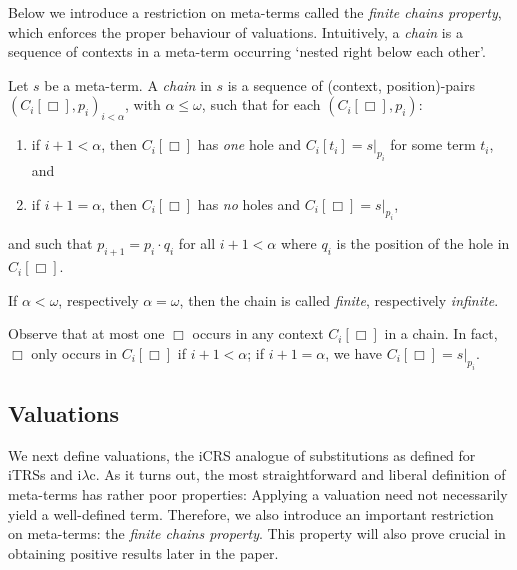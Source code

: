 \documentclass{LMCS}
\theoremstyle{plain}
\theoremstyle{definition}
\newcommand{\iLC}{i$\lambda$c\xspace}
\begin{document}
Below we introduce a restriction on meta-terms called the \emph{finite chains property}, which enforces the proper behaviour of valuations. Intuitively, a \emph{chain} is a sequence of contexts in a meta-term occurring `nested right below each other'.
\begin{defi}
Let $s$ be a meta-term.  A \emph{chain} in $s$ is a sequence
of (context, position)-pairs $(C_i[\Box],p_i)_{i < \alpha}$, with
$\alpha \leq \omega$, such that for each $(C_i[\Box], p_i)$:
\begin{enumerate}[(1)]
\item
if $i + 1 < \alpha$, then $C_i[\Box]$ has \emph{one} hole and $C_i[t_i] = s|_{p_i}$ for some term $t_i$, and
\item
if $i + 1 = \alpha$, then $C_i[\Box]$ has \emph{no} holes and $C_i[\Box] = s|_{p_i}$,
\end{enumerate}
and such that $p_{i+1} = p_i \cdot q_i$ for all $i + 1 < \alpha$ where $q_i$ is the position of the hole in $C_i[\Box]$.

If $\alpha < \omega$, respectively
$\alpha = \omega$, then the chain is called \emph{finite},
respectively \emph{infinite}.
\end{defi}
\noindent Observe that at most one $\Box$ occurs in any context $C_i[\Box]$ in a chain. In fact, $\Box$ only occurs in $C_i[\Box]$ if $i + 1 < \alpha$; if $i + 1 = \alpha$, we have $C_i[\Box] = s|_{p_i}$.

\subsection{Valuations}

We next define valuations, the iCRS analogue of substitutions as defined for iTRSs and \iLC. As it turns out, the most straightforward and liberal definition of meta-terms has rather poor properties: Applying a valuation
need not necessarily yield a well-defined term. Therefore, we also introduce an important restriction on meta-terms: the \emph{finite chains property}. This property will also prove crucial in obtaining positive results later in the paper.
\end{document}

